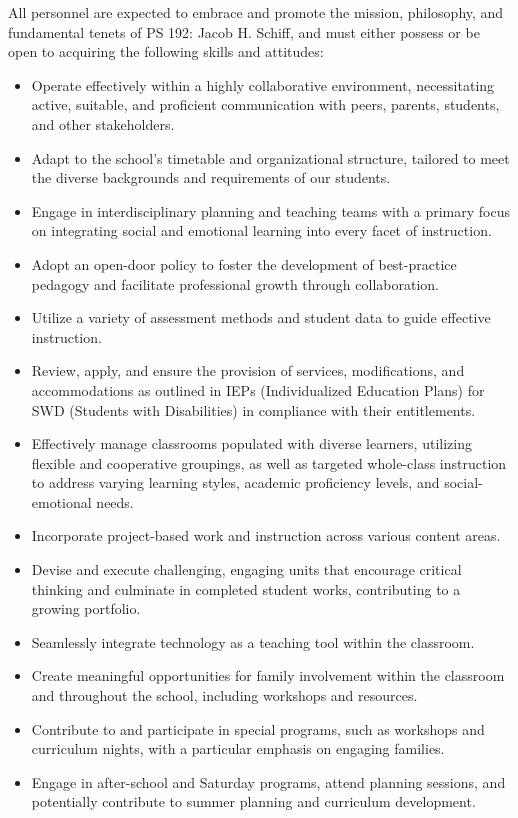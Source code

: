 \documentclass[11pt, letterpaper]{article}
\begin{document}
All personnel are expected to embrace and promote the mission, philosophy, and fundamental tenets of PS 192: Jacob H. Schiff, and must either possess or be open to acquiring the following skills and attitudes:
\begin{itemize}
\item Operate effectively within a highly collaborative environment, necessitating active, suitable, and proficient communication with peers, parents, students, and other stakeholders.
\item Adapt to the school's timetable and organizational structure, tailored to meet the diverse backgrounds and requirements of our students.
\item Engage in interdisciplinary planning and teaching teams with a primary focus on integrating social and emotional learning into every facet of instruction.
\item Adopt an open-door policy to foster the development of best-practice pedagogy and facilitate professional growth through collaboration.
\item Utilize a variety of assessment methods and student data to guide effective instruction.
\item Review, apply, and ensure the provision of services, modifications, and accommodations as outlined in IEPs (Individualized Education Plans) for SWD (Students with Disabilities) in compliance with their entitlements.
\item Effectively manage classrooms populated with diverse learners, utilizing flexible and cooperative groupings, as well as targeted whole-class instruction to address varying learning styles, academic proficiency levels, and social-emotional needs.
\item Incorporate project-based work and instruction across various content areas.
\item Devise and execute challenging, engaging units that encourage critical thinking and culminate in completed student works, 
contributing to a growing portfolio.
\item Seamlessly integrate technology as a teaching tool within the classroom.
\item Create meaningful opportunities for family involvement within the classroom and throughout the school, including workshops and resources.
\item Contribute to and participate in special programs, such as workshops and curriculum nights, with a particular emphasis on engaging families.
\item Engage in after-school and Saturday programs, attend planning sessions, and potentially contribute to summer planning and curriculum development.

\end{itemize}
\end{document}
